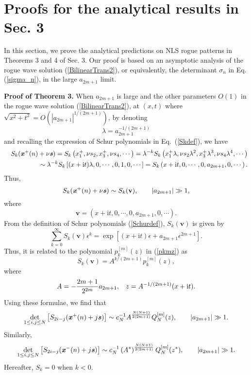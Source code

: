 \documentclass[amsmath,amssymb]{revtex4}
\def\[{\begin{equation}}
\def\]{\end{equation}}
\begin{document}
\section{Proofs for the analytical results in Sec. 3} \label{sec:proof}
In this section, we prove the analytical predictions on NLS rogue patterns in Theorems 3 and 4 of Sec. 3. Our proof is based on an asymptotic analysis of the rogue wave solution (\ref{BilinearTrans2}), or equivalently, the determinant $\sigma_n$ in Eq. (\ref{sigma_n}), in the large $a_{2m+1}$ limit.

\textbf{Proof of Theorem 3.} \hspace{0.05cm}
When $a_{2m+1}$ is large and the other parameters $O(1)$ in the rogue wave solution (\ref{BilinearTrans2}),
at $(x,t)$ where $\sqrt{x^2+t^2}=O\left(|a_{2m+1}|^{1/(2m+1)}\right)$, by denoting
\[ \label{deflambda}
\lambda=a_{2m+1}^{-1/(2m+1)}
\]
and recalling the expression of Schur polynomials in Eq.~(\ref{Skdef}), we have
\begin{eqnarray}\label{Skasym1}
&& S_{k}(\textbf{\emph{x}}^{+}(n) +\nu \textbf{\emph{s}}) =
S_{k}\left(x_{1}^{+}, \nu s_{2}, x_{3}^{+}, \nu s_4, \cdots\right)=\lambda^{-k} S_{k}\left(x_{1}^{+}\lambda, \nu s_{2} \lambda^2, x_{3}^{+} \lambda^3, \nu s_{4}\lambda^4, \cdots\right) \nonumber \\
&&\sim \lambda^{-k} S_{k}\left[(x+\textrm{i}t)\lambda, 0, \cdots, 0, 1, 0, \cdots\right]
=S_{k}\left(x+\textrm{i}t, 0, \cdots, 0, a_{2m+1}, 0, \cdots\right).
\end{eqnarray}
Thus,
\[ \label{Skxnasym}
S_k(\textbf{\emph{x}}^{+}(n) +\nu \textbf{\emph{s}})  \sim S_k(\textbf{v}), \quad \quad |a_{2m+1}| \gg 1,
\]
where
\[  \label{vdef}
\textbf{v}=(x+\textrm{i}t, 0, \cdots, 0, a_{2m+1}, 0, \cdots).
\]
From the definition of Schur polynomials (\ref{Schurdef}), $S_k(\textbf{v})$ is given by
\begin{equation}
\sum_{k=0}^{\infty}S_k(\textbf{v}) \epsilon^k
=\exp\left[(x+\textrm{i}t)\epsilon +a_{2m+1}\epsilon^{2m+1}\right].
\end{equation}
Thus, it is related to the polynomial $p_{k}^{[m]}(z)$ in (\ref{pkmz}) as
\begin{equation} \label{Skorder}
S_k(\textbf{v})=A^{k/(2m+1)}p_{k}^{[m]}(z),
\end{equation}
where
\begin{equation} \label{Az}
A=-\frac{2m+1}{2^{2m}}a_{2m+1}, \hspace{0.3cm} z=A^{-1/(2m+1)}(x+\textrm{i}t).
\end{equation}
Using these formulae, we find that
\begin{equation} \label{Splusasym}
\det_{1 \leq i, j\leq N} \left[S_{2i-j}(\textbf{\emph{x}}^{+}(n) +j \textbf{\emph{s}}) \right]
\sim c_N^{-1}A^{\frac{N(N+1)}{2(2m+1)}}Q_{N}^{[m]}(z), \quad \quad |a_{2m+1}| \gg 1.
\end{equation}
Similarly,
\begin{equation} \label{Sminusasym}
\det_{1 \leq i, j\leq N} \left[S_{2i-j}(\textbf{\emph{x}}^{-}(n) +j \textbf{\emph{s}}) \right] \sim
c_N^{-1}\left(A^*\right)^{\frac{N(N+1)}{2(2m+1)}}Q_{N}^{[m]}(z^*), \quad \quad |a_{2m+1}| \gg 1.
\end{equation}
Hereafter, $S_k= 0$ when $k<0$.
\end{document}
